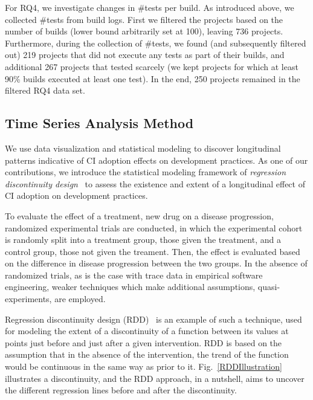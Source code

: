 For RQ4, we investigate changes in \#tests per build.
As introduced above, we collected \#tests from build logs. 
First we filtered the projects based on the number of builds
(lower bound arbitrarily set at 100), leaving 736 projects. 
Furthermore, during the collection of \#tests, we found (and subsequently
filtered out) 219 projects that did not execute any tests as part of their \Tvis 
builds, and additional 267 projects that tested scarcely (\ie we kept 
projects for which at least 90\% builds executed at least one test). 
In the end, 250 projects remained in the filtered RQ4 data set.

\subsection{Time Series Analysis Method}
\label{sec:tsa}

We use data visualization and statistical modeling to discover 
longitudinal patterns indicative of CI adoption effects on development practices.
As one of our contributions, we introduce the statistical modeling 
framework of \emph{regression discontinuity design}~\cite{imbens2008regression} 
to assess the existence and extent of a longitudinal effect of CI adoption on 
development practices.

To evaluate the effect of a treatment, \eg new drug on a disease progression, 
randomized experimental trials are conducted, 
in which the experimental 
cohort is randomly split into a treatment group, \ie those given the treatment, and 
a control group, \ie those not given the treament. 
Then, the effect is evaluated based on the difference in disease progression 
between the two groups.
In the absence of randomized trials, as is the case with trace data in 
empirical software engineering, weaker techniques which make 
additional assumptions, \eg quasi-experiments, are employed.

Regression discontinuity design (RDD)~\cite{imbens2008regression} is an example of such a technique, 
used for modeling the extent of a discontinuity of a function between its values 
at points just before and just after a given intervention. 
RDD is based on the assumption that in the absence of the intervention, the 
trend of the function would be continuous in the same way as prior to it.
Fig.~\ref{RDDIllustration} illustrates a discontinuity, and the RDD approach, in a nutshell, aims to uncover the 
 different regression lines before and after the discontinuity.


